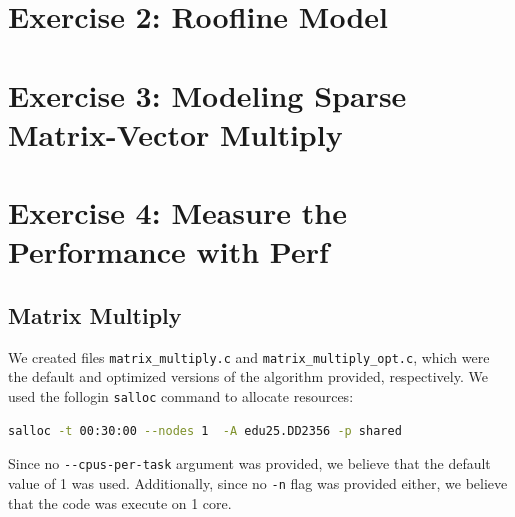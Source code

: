 \documentclass[a4paper,10pt]{article}
\begin{document}

\section{Exercise 2: Roofline Model}

\section{Exercise 3: Modeling Sparse Matrix-Vector Multiply}

\section{Exercise 4: Measure the Performance with Perf}
\subsection{Matrix Multiply}
We created files \verb|matrix_multiply.c| and \verb|matrix_multiply_opt.c|, which were the default and optimized versions of the algorithm provided, respectively. We used the follogin \verb|salloc| command to allocate resources: 

\begin{lstlisting}[language=bash,basicstyle=\ttfamily]
salloc -t 00:30:00 --nodes 1  -A edu25.DD2356 -p shared
\end{lstlisting}
Since no \verb|--cpus-per-task| argument was provided, we believe that the default value of 1 was used. Additionally, since no \verb|-n| flag was provided either, we believe that the code was execute on 1 core. 
\end{document}
